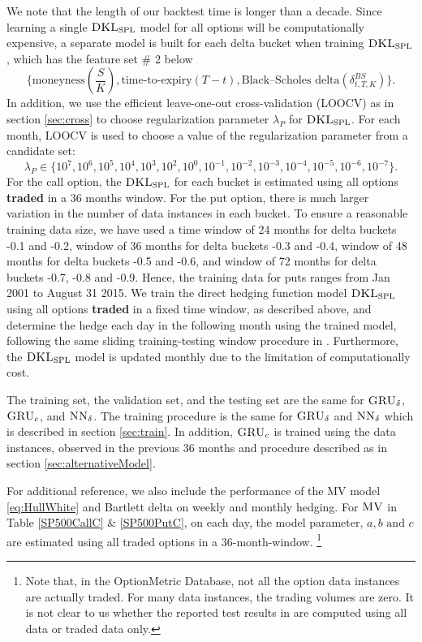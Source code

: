 \documentclass[letterpaper,12pt,titlepage,oneside,final]{book}
\numberwithin{equation}{section}
\theoremstyle{definition}
\newcommand{\model}{\textsc{GRU}_\delta}
\newcommand{\modelN}{\textsc{NN}_\delta}
\newcommand{\DKLs}{\bf\textsc{DKL}_{\text{SPL}}}
\newcommand{\MV}{\bf \textsc{MV}}
\begin{document}
We note that the length of our backtest time is longer than a decade.
 Since
learning a single $\DKLs$ model for all options will be computationally expensive,   a separate model is built for each delta bucket when training $\DKLs$, which has the feature set \# 2 below
 \[\{
	\text{moneyness}(\frac{S}{K}),\text{time-to-expiry}(T-t), \text{Black–Scholes delta}(\delta^{BS}_{t,T,K})
 \}.\]
 In addition,  we use the efficient leave-one-out cross-validation (LOOCV) as in section \ref{sec:cross} to choose regularization parameter $\lambda_P$ for $\DKLs$. For each month, LOOCV is used to choose a  value of the regularization parameter from a candidate set:
$$\lambda_P \in \{10^7,10^6,10^5,10^4,10^3,10^2,10^0,10^{-1},10^{-2}, 10^{-3},10^{-4},10^{-5},10^{-6},10^{-7} \}.$$
For the call option, the  $\DKLs$ for each bucket is estimated  using all options \textbf{traded} in a 36 months window. For the put option, there is much larger variation in the number of data instances in each bucket.
 To ensure a reasonable training data size, we have used a time window of 24 months for delta buckets -0.1 and -0.2,   window of 36 months for delta buckets -0.3 and -0.4,  window of 48 months  for delta buckets -0.5 and -0.6, and window of 72 months  for delta buckets -0.7, -0.8 and -0.9. Hence, the training data  for puts ranges from  Jan 2001 to August 31 2015.
We train the direct hedging function model $\DKLs$ using all options \textbf{traded} in a fixed time window, as described above, and determine the hedge each day in the following month using the trained model, following the same sliding training-testing window procedure in \citep{hulloptimal}. Furthermore, the  $\DKLs$  model is updated monthly due to the limitation of computationally cost.



 The training set, the validation set, and the testing set are the same for $\model$, $\textsc{GRU}_{c}$, and $\modelN$. The training procedure is the same for $\model$ and $\modelN$ which is described in section \ref{sec:train}. In addition, $\textsc{GRU}_{c}$ is trained using the data instances, observed in the previous 36 months and procedure described as in section \ref{sec:alternativeModel}. 
 
 For additional reference, we also include the performance of the MV model \eqref{eq:HullWhite}  and Bartlett delta on weekly and monthly hedging. For $\MV$ in Table \ref{SP500CallC} \& \ref{SP500PutC}, on each day,  the model parameter, $a,b \text{ and } c$ are estimated using all {traded} options in a 36-month-window. \footnote{Note that, in the OptionMetric Database, not all the option data instances are actually traded. For many data instances, the trading volumes are zero. It is not clear to us whether the reported test results in \citep{hulloptimal} are computed using all data or traded data only.} 
\end{document}
